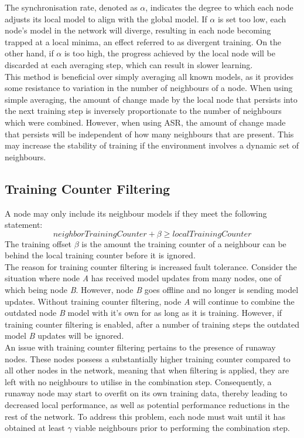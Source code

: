 \documentclass[letterpaper, 10 pt, conference]{ieeeconf}  %
\begin{document}
The synchronisation rate, denoted as $\alpha$, indicates the degree to which each node adjusts its local model to align with the global model. If $\alpha$ is set too low, each node's model in the network will diverge, resulting in each node becoming trapped at a local minima, an effect referred to as divergent training. On the other hand, if $\alpha$ is too high, the progress achieved by the local node will be discarded at each averaging step, which can result in slower learning. \\

This method is beneficial over simply averaging all known models, as it provides some resistance to variation in the number of neighbours of a node. When using simple averaging, the amount of change made by the local node that persists into the next training step is inversely proportionate to the number of neighbours which were combined. However, when using ASR, the amount of change made that persists will be independent of how many neighbours that are present. This may increase the stability of training if the environment involves a dynamic set of neighbours.

\subsection{Training Counter Filtering}
A node may only include its neighbour models if they meet the following statement:
\[neighborTrainingCounter + \beta \ge localTrainingCounter \]
The training offset $\beta$ is the amount the training counter of a neighbour can be behind the local training counter before it is ignored. \\

The reason for training counter filtering is increased fault tolerance. Consider the situation where node \emph{A} has received model updates from many nodes, one of which being node \emph{B}. However, node \emph{B} goes offline and no longer is sending model updates. Without training counter filtering, node \emph{A} will continue to combine the outdated node \emph{B} model with it's own for as long as it is training. However, if training counter filtering is enabled, after a number of training steps the outdated model \emph{B} updates will be ignored. \\

An issue with training counter filtering pertains to the presence of runaway nodes. These nodes possess a substantially higher training counter compared to all other nodes in the network, meaning that when filtering is applied, they are left with no neighbours to utilise in the combination step. Consequently, a runaway node may start to overfit on its own training data, thereby leading to decreased local performance, as well as potential performance reductions in the rest of the network. To address this problem, each node must wait until it has obtained at least $\gamma$ viable neighbours prior to performing the combination step.
\end{document}
